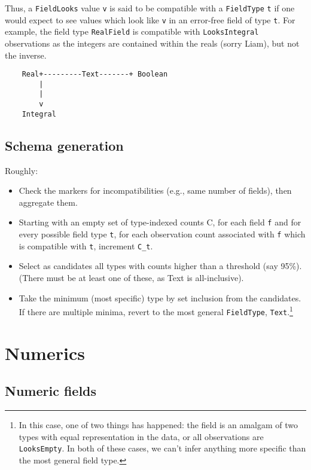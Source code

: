 \documentclass[a4paper]{article}
\begin{document}
Thus, a \texttt{FieldLooks} value \texttt{v} is said to be compatible
with a \texttt{FieldType} \texttt{t} if one would expect to see values
which look like \texttt{v} in an error-free field of type \texttt{t}.
For example, the field type \texttt{RealField} is compatible with
\texttt{LooksIntegral} observations as the integers are contained within
the reals (sorry Liam), but not the inverse.

\begin{verbatim}
    Real+---------Text-------+ Boolean
        |
        |
        v
    Integral
\end{verbatim}

\subsection{Schema generation}\label{schema-generation}

Roughly:

\begin{itemize}
\item
  Check the markers for incompatibilities (e.g., same number of fields),
  then aggregate them.
\item
  Starting with an empty set of type-indexed counts C, for each field
  \texttt{f} and for every possible field type \texttt{t}, for each
  observation count associated with \texttt{f} which is compatible with
  \texttt{t}, increment \texttt{C\_t}.
\item
  Select as candidates all types with counts higher than a threshold
  (say 95\%). (There must be at least one of these, as Text is
  all-inclusive).
\item
  Take the minimum (most specific) type by set inclusion from the
  candidates. If there are multiple minima, revert to the most general
  \texttt{FieldType}, \texttt{Text}.\footnote{In this case, one of two
    things has happened: the field is an amalgam of two types with
    equal representation in the data, or all observations are
    \texttt{LooksEmpty}. In both of these cases, we can't infer
    anything more specific than the most general field type.}
\end{itemize}

\section{Numerics}\label{numerics}

\subsection{Numeric fields}\label{numeric-fields}
\end{document}
